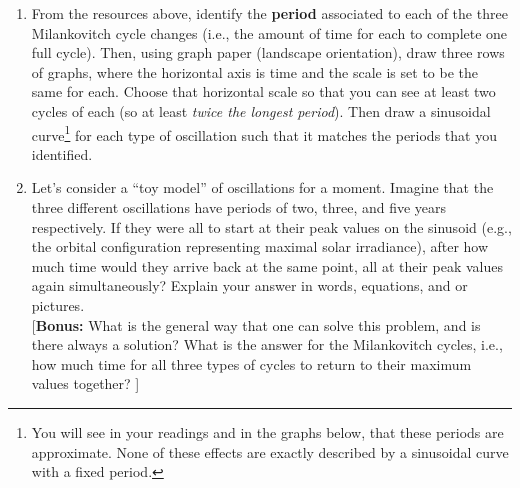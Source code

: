 \documentclass[12pt]{article}
\begin{document}
\begin{enumerate}
\begin{enumerate}
\begin{enumerate}[label=(\roman*)]
		\end{enumerate}
	\item From the resources above, identify the {\bf period} associated to each of the three Milankovitch cycle changes (i.e., the amount of time for each to complete one full cycle).  Then, using graph paper (landscape orientation), draw three rows of graphs, where the horizontal axis is time and the scale is set to be the same for each.  Choose that horizontal scale so that you can see at least two cycles of each (so at least {\em twice the longest period}).  Then draw a sinusoidal curve\footnote{You will see in your readings and in the graphs below, that these periods are approximate. None of these effects are exactly described by a sinusoidal curve with a fixed period.}  for each type of oscillation such that it matches the periods that you identified.
	\item Let's consider a ``toy model'' of oscillations for a moment.  Imagine that the three different oscillations have periods of two, three, and five years respectively.  If they were all to start at their peak values on the sinusoid (e.g., the orbital configuration representing maximal solar irradiance), after how much time would they arrive back at the same point, all at their peak values again simultaneously? Explain your answer in words, equations, and or pictures. \\[6pt] 	 [{\bf Bonus:} What is the general way that one can solve this problem, and is there always a solution?  What is the answer for the Milankovitch cycles, i.e., how much time for all three types of cycles to return to their maximum values together? ]	
	\end{enumerate}

\newpage


\end{enumerate}
\end{document}
